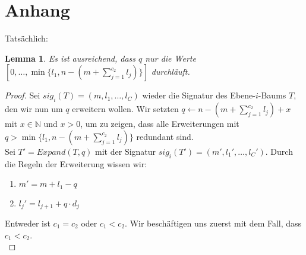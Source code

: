 \documentclass[a4paper,10pt,ngerman]{scrartcl}
\newtheorem{lemma}[satz]{Lemma}
\begin{document}
    \section{Anhang}
    Tatsächlich:
    \begin{lemma}
        \label{lem:reader_2}
        Es ist ausreichend, dass $q$ nur die Werte $[0, \dots, \min\{l_1, n - (m + \sum^{c_2}_{j=1} l_j)\}]$ durchläuft.
    \end{lemma}
    \begin{proof}
        Sei $sig_i(T) = (m, l_1, \dots, l_C)$ wieder die Signatur des Ebene-$i$-Baums $T$, den wir nun um $q$ erweitern wollen.
        Wir setzten $q \gets n - (m + \sum^{c_2}_{j=1} l_j) + x$ mit $x \in \mathbb N$ und $x > 0$, um zu zeigen, dass alle Erweiterungen mit $q > \min\{l_1, n - (m + \sum^{c_2}_{j=1} l_j)\}$ redundant sind. \\
        Sei $T' = Expand(T, q)$ mit der Signatur $sig_i(T') = (m', l_1', \dots, l_C')$.
        Durch die Regeln der Erweiterung wissen wir:
        \begin{enumerate}
            \item $m' = m + l_1 - q$
            \item $l_j' = l_{j+1} + q \cdot d_j$
        \end{enumerate}
        Entweder ist $c_1 = c_2$ oder $c_1 < c_2$.
        Wir beschäftigen uns zuerst mit dem Fall, dass $c_1 < c_2$. \\


\end{proof}
\end{document}

